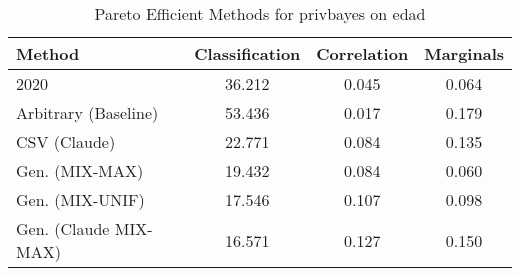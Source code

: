 \begin{table}[t!]
    \centering
    \caption{Pareto Efficient Methods for privbayes on edad}
    \label{tab:pareto_efficient_methods_privbayes_edad}
    \begin{tabular}{lccc}
    \toprule
    Method & Classification & Correlation & Marginals \\
    \midrule
    2020 & 36.212 & \cellcolor{silver!30}0.045 & \cellcolor{silver!30}0.064 \\
    Arbitrary (Baseline) & 53.436 & \cellcolor{gold!30}0.017 & 0.179 \\
    CSV (Claude) & 22.771 & \cellcolor{bronze!30}0.084 & 0.135 \\
    Gen. (MIX-MAX) & \cellcolor{bronze!30}19.432 & 0.084 & \cellcolor{gold!30}0.060 \\
    Gen. (MIX-UNIF) & \cellcolor{silver!30}17.546 & 0.107 & \cellcolor{bronze!30}0.098 \\
    Gen. (Claude MIX-MAX) & \cellcolor{gold!30}16.571 & 0.127 & 0.150 \\
    \bottomrule
    \end{tabular}
\end{table}